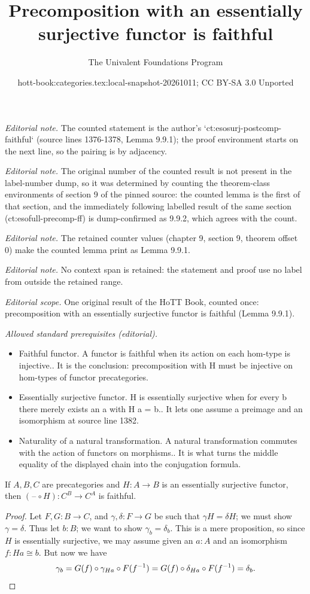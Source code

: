 \documentclass[10pt,a4paper]{article}
\title{Precomposition with an essentially surjective functor is faithful}
\author{The Univalent Foundations Program}
\date{hott-book:categories.tex:local-snapshot-20261011; CC BY-SA 3.0 Unported}
\newcounter{chapter}
\newcommand{\blank}{\mathord{\hspace{1pt}\text{--}\hspace{1pt}}}
\newcommand{\inv}[1]{{#1}^{-1}}
\theoremstyle{definition}
\theoremstyle{remark}
\numberwithin{equation}{section}
\begin{document}
\maketitle
\setcounter{chapter}{9}
\setcounter{section}{9}
\setcounter{thm}{0}
\noindent\textit{Editorial note.} The counted statement is the author's `ct:esosurj-postcomp-faithful` (source lines 1376-1378, Lemma 9.9.1); the proof environment starts on the next line, so the pairing is by adjacency.\par\medskip
\noindent\textit{Editorial note.} The original number of the counted result is not present in the label-number dump, so it was determined by counting the theorem-class environments of section 9 of the pinned source: the counted lemma is the first of that section, and the immediately following labelled result of the same section (ct:esofull-precomp-ff) is dump-confirmed as 9.9.2, which agrees with the count.\par\medskip
\noindent\textit{Editorial note.} The retained counter values (chapter 9, section 9, theorem offset 0) make the counted lemma print as Lemma 9.9.1.\par\medskip
\noindent\textit{Editorial note.} No context span is retained: the statement and proof use no label from outside the retained range.\par\medskip
\noindent\textit{Editorial scope.} One original result of the HoTT Book, counted once: precomposition with an essentially surjective functor is faithful (Lemma 9.9.1).\par\medskip
\noindent\textit{Allowed standard prerequisites (editorial).}\begin{itemize}
\item Faithful functor. A functor is faithful when its action on each hom-type is injective.. It is the conclusion: precomposition with H must be injective on hom-types of functor precategories.
\item Essentially surjective functor. H is essentially surjective when for every b there merely exists an a with H a = b.. It lets one assume a preimage and an isomorphism at source line 1382.
\item Naturality of a natural transformation. A natural transformation commutes with the action of functors on morphisms.. It is what turns the middle equality of the displayed chain into the conjugation formula.
\end{itemize}\medskip
\begin{lem}\label{ct:esosurj-postcomp-faithful}
  If $A,B,C$ are precategories and $H:A\to B$ is an essentially surjective functor, then $(\blank\circ H):C^B \to C^A$ is faithful.
\end{lem}

\begin{proof}
  Let $F,G:B\to C$, and $\gamma,\delta:F\to G$ be such that $\gamma H = \delta H$; we must show $\gamma=\delta$.
  Thus let $b:B$; we want to show $\gamma_b=\delta_b$.
  This is a mere proposition, so since $H$ is essentially surjective, we may assume given an $a:A$ and an isomorphism $f:Ha\cong b$.
  But now we have
  \[ \gamma_b = G(f) \circ \gamma_{Ha} \circ F(\inv{f})
  = G(f) \circ \delta_{Ha} \circ F(\inv{f})
  = \delta_b.\qedhere
  \]
\end{proof}
\end{document}
